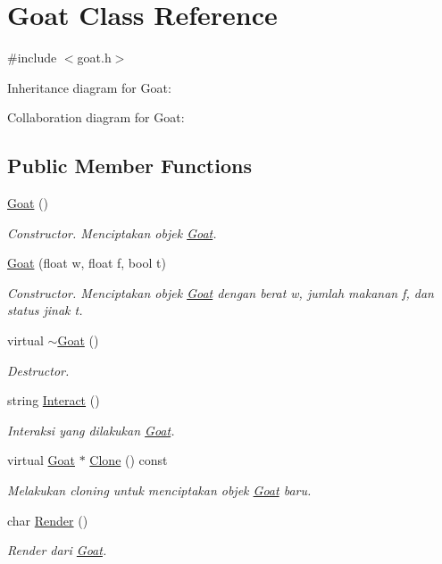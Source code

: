 \hypertarget{classGoat}{}\section{Goat Class Reference}
\label{classGoat}


{\ttfamily \#include $<$goat.\+h$>$}



Inheritance diagram for Goat\+:


Collaboration diagram for Goat\+:
\subsection*{Public Member Functions}
\begin{DoxyCompactItemize}
\item 
\hyperlink{classGoat_acf506b76c8503c9749df191a92dc99f9}{Goat} ()
\begin{DoxyCompactList}\small\item\em Constructor. Menciptakan objek \hyperlink{classGoat}{Goat}. \end{DoxyCompactList}\item 
\hyperlink{classGoat_a4b0531179ba8082e4123d1534578e226}{Goat} (float w, float f, bool t)
\begin{DoxyCompactList}\small\item\em Constructor. Menciptakan objek \hyperlink{classGoat}{Goat} dengan berat w, jumlah makanan f, dan status jinak t. \end{DoxyCompactList}\item 
virtual \hyperlink{classGoat_a47af45317eec8718356b20a10e31af27}{$\sim$\+Goat} ()
\begin{DoxyCompactList}\small\item\em Destructor. \end{DoxyCompactList}\item 
string \hyperlink{classGoat_a5f480d88c50724cee8c7a9d18f486144}{Interact} ()
\begin{DoxyCompactList}\small\item\em Interaksi yang dilakukan \hyperlink{classGoat}{Goat}. \end{DoxyCompactList}\item 
virtual \hyperlink{classGoat}{Goat} $\ast$ \hyperlink{classGoat_a1532200ef20734bb42d0a1306b14d8ad}{Clone} () const 
\begin{DoxyCompactList}\small\item\em Melakukan cloning untuk menciptakan objek \hyperlink{classGoat}{Goat} baru. \end{DoxyCompactList}\item 
char \hyperlink{classGoat_aedea4680fe17571c2f51d35b90397f6e}{Render} ()
\begin{DoxyCompactList}\small\item\em Render dari \hyperlink{classGoat}{Goat}. \end{DoxyCompactList}\end{DoxyCompactItemize}
